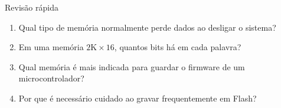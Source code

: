 \begin{frame}[t]{Revisão rápida}
  \begin{enumerate}
    \item Qual tipo de memória normalmente perde dados ao desligar o sistema?
    \item Em uma memória $2\text{K} \times 16$, quantos bits há em cada palavra?
    \item Qual memória é mais indicada para guardar o firmware de um microcontrolador?
    \item Por que é necessário cuidado ao gravar frequentemente em Flash?
  \end{enumerate}
\end{frame}
